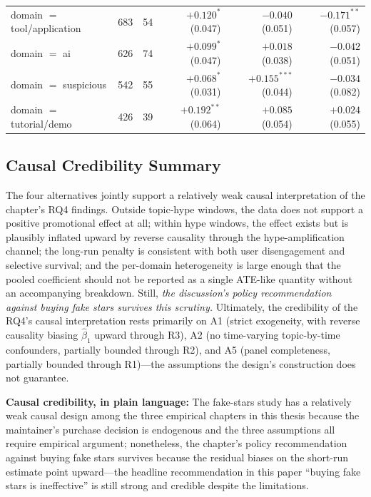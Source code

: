 \begin{table}[t]
\begin{tabular}{lrrrrr}
    \quad domain $=$ tool/application & 683 & 54 & $+0.120^{*}$ (0.047) & $-0.040$ (0.051) & $-0.171^{**}$ (0.057) \\
    \quad domain $=$ ai & 626 & 74 & $+0.099^{*}$ (0.047) & $+0.018$ (0.038) & $-0.042$ (0.051) \\
    \quad domain $=$ suspicious & 542 & 55 & $+0.068^{*}$ (0.031) & $+0.155^{***}$ (0.044) & $-0.034$ (0.082) \\
    \quad domain $=$ tutorial/demo & 426 & 39 & $+0.192^{**}$ (0.064) & $+0.085$ (0.054) & $+0.024$ (0.055) \\
    \bottomrule
    \end{tabular}
\end{table}

\subsection{Causal Credibility Summary}
\label{sec:fake-stars-credibility-summary}

The four alternatives jointly support a relatively weak causal interpretation of the chapter's RQ4 findings.
Outside topic-hype windows, the data does not support a positive promotional effect at all; within hype windows, the effect exists but is plausibly inflated upward by reverse causality through the hype-amplification channel; the long-run penalty is consistent with both user disengagement and selective survival; and the per-domain heterogeneity is large enough that the pooled coefficient should not be reported as a single ATE-like quantity without an accompanying breakdown.
Still, \emph{the discussion's policy recommendation against buying fake stars survives this scrutiny.}
Ultimately, the credibility of the RQ4's causal interpretation rests primarily on A1 (strict exogeneity, with reverse causality biasing $\hat\beta_1$ upward through R3), A2 (no time-varying topic-by-time confounders, partially bounded through R2), and A5 (panel completeness, partially bounded through R1)---the assumptions the design's construction does not guarantee.

\begin{summary-rq}
\textbf{Causal credibility, in plain language:} The fake-stars study has a relatively weak causal design among the three empirical chapters in this thesis because the maintainer's purchase decision is endogenous and the three assumptions all require empirical argument; nonetheless, the chapter's policy recommendation against buying fake stars survives because the residual biases on the short-run estimate point upward---the headline recommendation in this paper ``buying fake stars is ineffective'' is still strong and credible despite the limitations.
\end{summary-rq}
